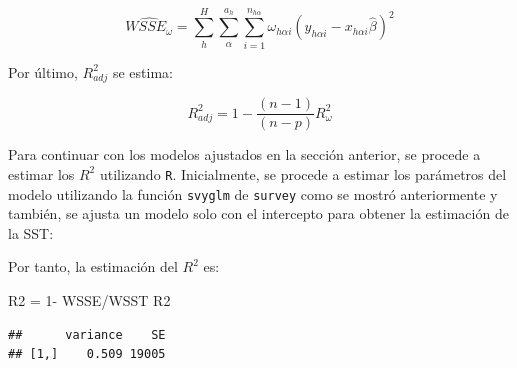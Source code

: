 \documentclass[
  12pt,
]{book}
\newenvironment{Shaded}{\begin{snugshade}}{\end{snugshade}}
\newcommand{\AttributeTok}[1]{\textcolor[rgb]{0.77,0.63,0.00}{#1}}
\newcommand{\DecValTok}[1]{\textcolor[rgb]{0.00,0.00,0.81}{#1}}
\newcommand{\FunctionTok}[1]{\textcolor[rgb]{0.00,0.00,0.00}{#1}}
\newcommand{\NormalTok}[1]{#1}
\newcommand{\OtherTok}[1]{\textcolor[rgb]{0.56,0.35,0.01}{#1}}
\newcommand{\SpecialCharTok}[1]{\textcolor[rgb]{0.00,0.00,0.00}{#1}}
\begin{document}
\[
\hat{WSSE_{\omega}}  =  \sum_{h}^{H}\sum_{\alpha}^{a_{h}}\sum_{i=1}^{n_{h\alpha}}\omega_{h\alpha i}\left(y_{h\alpha i}-x_{h\alpha i}\hat{\beta}\right)^{2}
\]

Por último, \(R_{adj}^{2}\) se estima:

\[
R_{adj}^{2}  =  1-\frac{\left(n-1\right)}{\left(n-p\right)}R_{\omega}^{2}
\]

Para continuar con los modelos ajustados en la sección anterior, se procede a estimar los \(R^{2}\) utilizando \texttt{R}. Inicialmente, se procede a estimar los parámetros del modelo utilizando la función \texttt{svyglm} de \texttt{survey} como se mostró anteriormente y también, se ajusta un modelo solo con el intercepto para obtener la estimación de la SST:

\begin{Shaded}
\end{Shaded}

Por tanto, la estimación del \(R^{2}\) es:

\begin{Shaded}
\begin{Highlighting}[]
\NormalTok{R2 }\OtherTok{=} \DecValTok{1}\SpecialCharTok{{-}}\NormalTok{ WSSE}\SpecialCharTok{/}\NormalTok{WSST}
\NormalTok{R2}
\end{Highlighting}
\end{Shaded}

\begin{verbatim}
##      variance    SE
## [1,]    0.509 19005
\end{verbatim}
\end{document}
